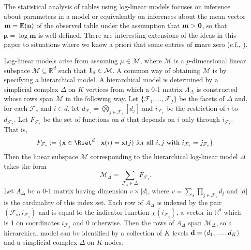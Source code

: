 \documentclass{elsart}
\newcommand{\bx}{{\mathbf x}}
\begin{document}
The statistical analysis of tables using log-linear models focuses on inference 
about parameters in a model or equivalently on 
 inferences about  the mean vector ${\bf m} =
\mathbb{E}({\bf n})$ of the observed table under the assumption that
${\bf m} > {\bf 0}$, so that $\mathbf{\mu} = \log \mathbf{m}$ is well
defined.  There are interesting extensions of the ideas in this paper to situations 
where we know a priori that some entries of ${\bf m}$are zero (c.f., \cite{BFH75,HAB74,FIE70}).

Log-linear models arise from assuming $\mu \in
\mathcal{M}$, where $\mathcal{M}$ is a $p$-dimensional linear subspace
$\mathcal{M} \subseteq \mathbb{R} ^ d$ such that ${\bf 1}_d \in
\mathcal{M}$. 
A common way of obtaining $\mathcal{M}$ is by specifying a
hierarchical model.  A hierarchical model is determined by a simplicial
complex $\Delta$ on $K$ vertices from which a 0-1 matrix $A_{\Delta}$
is constructed whose rows span $\mathcal{M}$ in the following way.   Let $\{
\mathcal{F}_1,\ldots,\mathcal{F}_f\}$ be the facets of $\Delta$ and,
for each $\mathcal{F}_s$ and $ i \in d$, let $d_{\mathcal{F}_s} =
\bigotimes_{j \in {\mathcal{F}_s}} [d_j]$ and $i_{\mathcal{F}_s}$ be the
restriction of $i$ to $d_{\mathcal{F}_s}$. Let $F_{\mathcal{F}_s}$ be
the set of functions on $d$ that depends on $i$ only
through $i_{\mathcal{F}_s}$.  That is,
\[
F_{\mathcal{F}_s} := 
\{ \bx \in \Rset^d \mid \bx(i) = \bx(j) \text{ for all } i,j \text{ with }  i_{\mathcal{F}_s}=j_{\mathcal{F}_s} \}.
\]
Then the linear subspace $\mathcal{M}$ corresponding to the
hierarchical log-linear model  $\Delta$ takes the form
\[
\mathcal{M}_{\Delta} = \sum_{\mathcal{F}_s \in \Delta} F_{\mathcal{F}_s}.
\]
Let $A_{\Delta}$ be a 0-1 matrix having dimension $v \times |d|$, where
$v = \sum_s \prod_{j \in \mathcal{F}_s} d_j$ and $|d|$ is the
cardinality of this index set.  Each row of $A_{\Delta}$ is indexed
by the pair $(\mathcal{F}_s, i_{\mathcal{F}_s})$ and is equal to the
indicator  function
$\chi(i_{\mathcal{F}_s})$, a  vector in $\mathbb{R}^d$ which
is 1 on coordinates $i_{\mathcal{F}_f}$ and 0 otherwise.  Then the
rows of $A_{\Delta}$ span  $\mathcal{M}_\Delta$,
so a hierarchical model can be identified by a collection of $K$
levels  ${\bf d} = (d_1,\ldots,d_K)$ and a simplicial complex $\Delta$
on $K$ nodes.
\end{document}
